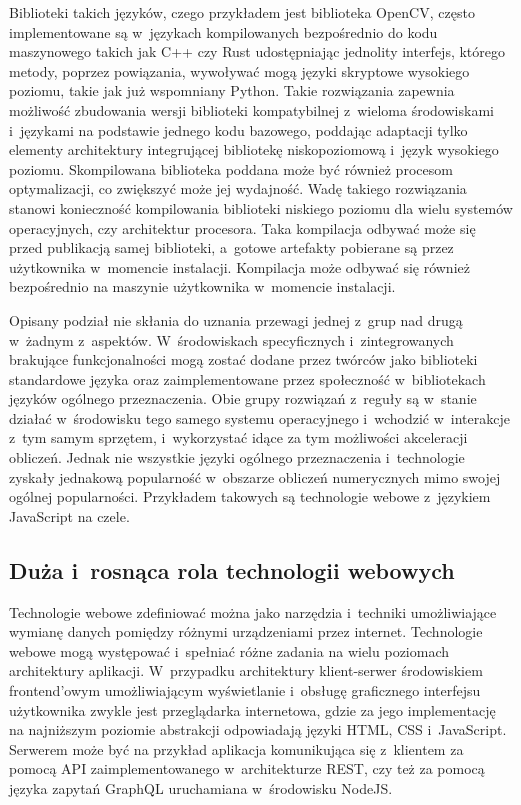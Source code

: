 Biblioteki takich języków, czego przykładem jest biblioteka OpenCV, często implementowane są w~językach kompilowanych bezpośrednio do kodu maszynowego takich jak C++ czy Rust udostępniając jednolity interfejs, którego metody, poprzez powiązania, wywoływać mogą języki skryptowe wysokiego poziomu, takie jak już wspomniany Python. Takie rozwiązania zapewnia możliwość zbudowania wersji biblioteki kompatybilnej z~wieloma środowiskami i~językami na podstawie jednego kodu bazowego, poddając adaptacji tylko elementy architektury integrującej bibliotekę niskopoziomową i~język wysokiego poziomu. Skompilowana biblioteka poddana może być również procesom optymalizacji, co zwiększyć może jej wydajność. Wadę takiego rozwiązania stanowi konieczność kompilowania biblioteki niskiego poziomu dla wielu systemów operacyjnych, czy architektur procesora. Taka kompilacja odbywać może się przed publikacją samej biblioteki, a~gotowe artefakty pobierane są przez użytkownika w~momencie instalacji. Kompilacja może odbywać się również bezpośrednio na maszynie użytkownika w~momencie instalacji.

Opisany podział nie skłania do uznania przewagi jednej z~grup nad drugą w~żadnym z~aspektów. W~środowiskach specyficznych i~zintegrowanych brakujące funkcjonalności mogą zostać dodane przez twórców jako biblioteki standardowe języka oraz zaimplementowane przez społeczność w~bibliotekach języków ogólnego przeznaczenia. Obie grupy rozwiązań z~reguły są w~stanie działać w~środowisku tego samego systemu operacyjnego i~wchodzić w~interakcje z~tym samym sprzętem, i~wykorzystać idące za tym możliwości akceleracji obliczeń. Jednak nie wszystkie języki ogólnego przeznaczenia i~technologie zyskały jednakową popularność w~obszarze obliczeń numerycznych mimo swojej ogólnej popularności. Przykładem takowych są technologie webowe z~językiem JavaScript na czele.

\subsection{Duża i~rosnąca rola technologii webowych}

Technologie webowe zdefiniować można jako narzędzia i~techniki umożliwiające wymianę danych pomiędzy różnymi urządzeniami przez internet. Technologie webowe mogą występować i~spełniać różne zadania na wielu poziomach architektury aplikacji. W~przypadku architektury klient-serwer środowiskiem frontend'owym umożliwiającym wyświetlanie i~obsługę graficznego interfejsu użytkownika zwykle jest przeglądarka internetowa, gdzie za jego implementację na najniższym poziomie abstrakcji odpowiadają języki HTML, CSS i~JavaScript. Serwerem może być na przykład aplikacja komunikująca się z~klientem za pomocą API zaimplementowanego w~architekturze REST, czy też za pomocą języka zapytań GraphQL uruchamiana w~środowisku NodeJS. 

